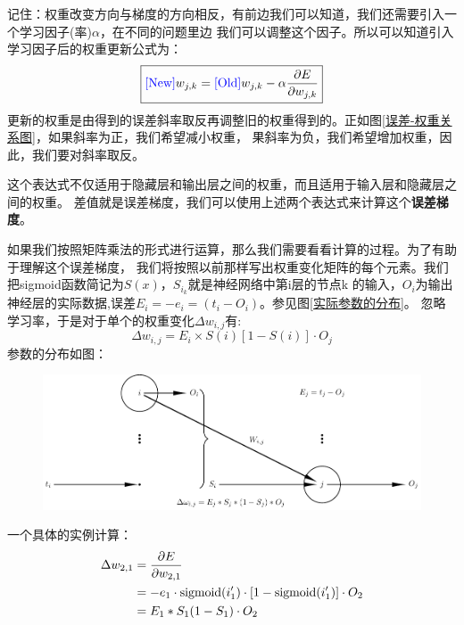 \documentclass[12pt]{article}
\begin{document}
    记住：权重改变方向与梯度的方向相反，有前边我们可以知道，我们还需要引入一个学习因子(率)$\alpha$，在不同的问题里边
    我们可以调整这个因子。所以可以知道引入学习因子后的权重更新公式为：
    \begin{equation}
        \boxed{{\rm\color{blue}[New]}w_{j,k}={\rm\color{blue}[Old]}w_{j,k}-\alpha \frac{\partial E}{\partial w_{j,k}}}
    \end{equation}
    更新的权重是由得到的误差斜率取反再调整旧的权重得到的。正如图\ref{误差-权重关系图}，如果斜率为正，我们希望减小权重，
    果斜率为负，我们希望增加权重，因此，我们要对斜率取反。
    
    这个表达式不仅适用于隐藏层和输出层之间的权重，而且适用于输入层和隐藏层之间的权重。
    差值就是误差梯度，我们可以使用上述两个表达式来计算这个\textbf{误差梯度}。

    如果我们按照矩阵乘法的形式进行运算，那么我们需要看看计算的过程。为了有助于理解这个误差梯度，
    我们将按照以前那样写出权重变化矩阵的每个元素。我们把sigmoid函数简记为$S(x)$，$S_{i_k}$就是神经网络中第i层的节点k
    的输入，$O_i$为输出神经层的实际数据,误差$E_i=-e_i=(t_i-O_i)$。参见图\ref{实际参数的分布}。
    忽略学习率，于是对于单个的权重变化$\Delta w_{i,j}$有:
    \begin{equation}
        \Delta w_{i,j} = E_i\times S(i)[1-S(i)] \cdot O_j
    \end{equation}
    参数的分布如图：
    \begin{figure}[!htb]
        \centering
        \includegraphics[scale=0.7]{picture/coef_distrio.pdf}
    \end{figure}
    \newpage
    一个具体的实例计算：
    \begin{align}
        \Delta w_{2,1} 
        & = \frac{\partial E}{\partial w_{2,1}} \nonumber \\
        & =-e_1\cdot {\rm sigmoid}(i'_1)\cdot [1-{\rm sigmoid}(i'_1)]\cdot O_2 \nonumber\\
        &  = E_1*S_1(1-S_1)\cdot O_2 \nonumber
    \end{align}
\end{document}
